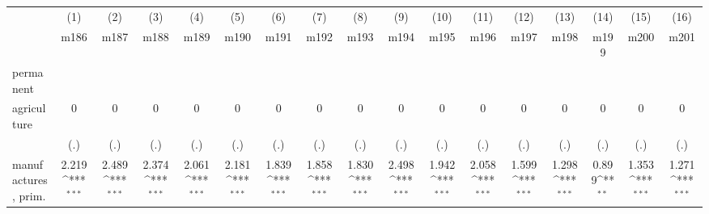 {
\def\sym#1{\ifmmode^{#1}\else\(^{#1}\)\fi}
\begin{tabular}{l*{16}{c}}
\hline\hline
                    &\multicolumn{1}{c}{(1)}&\multicolumn{1}{c}{(2)}&\multicolumn{1}{c}{(3)}&\multicolumn{1}{c}{(4)}&\multicolumn{1}{c}{(5)}&\multicolumn{1}{c}{(6)}&\multicolumn{1}{c}{(7)}&\multicolumn{1}{c}{(8)}&\multicolumn{1}{c}{(9)}&\multicolumn{1}{c}{(10)}&\multicolumn{1}{c}{(11)}&\multicolumn{1}{c}{(12)}&\multicolumn{1}{c}{(13)}&\multicolumn{1}{c}{(14)}&\multicolumn{1}{c}{(15)}&\multicolumn{1}{c}{(16)}\\
                    &\multicolumn{1}{c}{m186}&\multicolumn{1}{c}{m187}&\multicolumn{1}{c}{m188}&\multicolumn{1}{c}{m189}&\multicolumn{1}{c}{m190}&\multicolumn{1}{c}{m191}&\multicolumn{1}{c}{m192}&\multicolumn{1}{c}{m193}&\multicolumn{1}{c}{m194}&\multicolumn{1}{c}{m195}&\multicolumn{1}{c}{m196}&\multicolumn{1}{c}{m197}&\multicolumn{1}{c}{m198}&\multicolumn{1}{c}{m199}&\multicolumn{1}{c}{m200}&\multicolumn{1}{c}{m201}\\
\hline
permanent           &                     &                     &                     &                     &                     &                     &                     &                     &                     &                     &                     &                     &                     &                     &                     &                     \\
agriculture         &           0         &           0         &           0         &           0         &           0         &           0         &           0         &           0         &           0         &           0         &           0         &           0         &           0         &           0         &           0         &           0         \\
                    &         (.)         &         (.)         &         (.)         &         (.)         &         (.)         &         (.)         &         (.)         &         (.)         &         (.)         &         (.)         &         (.)         &         (.)         &         (.)         &         (.)         &         (.)         &         (.)         \\
[1em]
manufactures, prim. &       2.219\sym{***}&       2.489\sym{***}&       2.374\sym{***}&       2.061\sym{***}&       2.181\sym{***}&       1.839\sym{***}&       1.858\sym{***}&       1.830\sym{***}&       2.498\sym{***}&       1.942\sym{***}&       2.058\sym{***}&       1.599\sym{***}&       1.298\sym{***}&       0.899\sym{**} &       1.353\sym{***}&       1.271\sym{***}\\

\end{tabular}}
